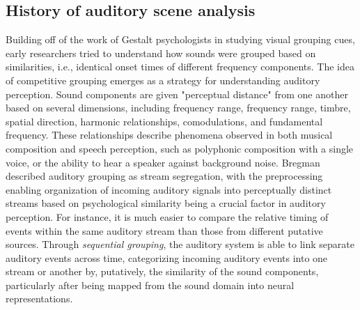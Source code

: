 \subsection{History of auditory scene analysis}

Building off of the work of Gestalt psychologists in studying visual grouping cues, early researchers tried to understand how sounds were grouped based on similarities, i.e., identical onset times of different frequency components. The idea of competitive grouping emerges \cite{Bregman} as a strategy for understanding auditory perception. Sound components are given "perceptual distance" from one another based on several dimensions, including frequency range, frequency range, timbre, spatial direction, harmonic relationships, comodulations, and fundamental frequency. These relationships describe phenomena observed in both musical composition and speech perception, such as polyphonic composition with a single voice, or the ability to hear a speaker against background noise. Bregman described auditory grouping as stream segregation, with the preprocessing enabling organization of incoming auditory signals into perceptually distinct streams based on psychological similarity being a crucial factor in auditory perception. For instance, it is much easier to compare the relative timing of events within the same auditory stream than those from different putative sources. Through \emph{sequential grouping}, the auditory system is able to link separate auditory events across time, categorizing incoming auditory events into one stream or another by, putatively, the similarity of the sound components, particularly after being mapped from the sound domain into neural representations.


